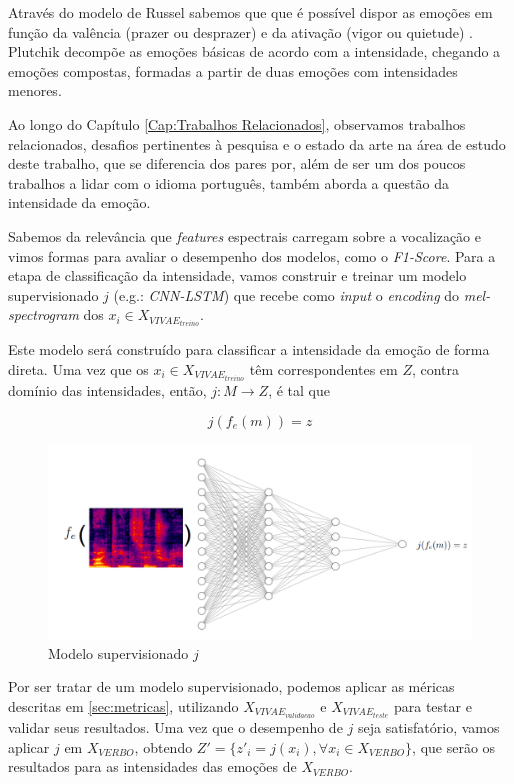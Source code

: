 Através do modelo de Russel sabemos que que é possível dispor as emoções em função da valência (prazer ou desprazer) e da ativação (vigor ou quietude) \cite{27}. Plutchik decompõe as emoções básicas de acordo com a intensidade, chegando a emoções compostas, formadas a partir de duas emoções com intensidades menores.

Ao longo do Capítulo \ref{Cap:Trabalhos Relacionados}, observamos trabalhos relacionados, desafios pertinentes à pesquisa e o estado da arte na área de estudo deste trabalho, que se diferencia dos pares por, além de ser um dos poucos trabalhos a lidar com o idioma português, também aborda a questão da intensidade da emoção.

Sabemos da relevância que \textit{features} espectrais carregam sobre a vocalização e vimos formas para avaliar o desempenho dos modelos, como o \textit{F1-Score}. Para a etapa de classificação da intensidade, vamos construir e treinar um modelo supervisionado $j$ (e.g.: \textit{CNN-LSTM}) que recebe como \textit{input} o \textit{encoding} do \textit{mel-spectrogram} dos $x_i \in X_{VIVAE_{treino}}$.

Este modelo será construído para classificar a intensidade da emoção de forma direta. Uma vez que os $x_i \in X_{VIVAE_{treino}}$ têm correspondentes em $Z$, contra domínio das intensidades, então, $j: M \rightarrow Z$, é tal que

\begin{equation}
    j(f_e(m)) = z
\end{equation}

\begin{figure}[!h]
\centering
\includegraphics[width=1.0\textwidth]{imagens/p-supervisionado.png}
\caption{\label{fig:jsupervisionado}Modelo supervisionado $j$}
\end{figure}

Por ser tratar de um modelo supervisionado, podemos aplicar as méricas descritas em \ref{sec:metricas}, utilizando $X_{VIVAE_{validacao}}$ e $X_{VIVAE_{teste}}$ para testar e validar seus resultados. Uma vez que o desempenho de $j$ seja satisfatório, vamos aplicar $j$ em $X_{VERBO}$, obtendo $Z' = \{z'{_i} = j(x_i), \forall x_i \in X_{VERBO}\}$, que serão os resultados para as intensidades das emoções de $X_{VERBO}$.

